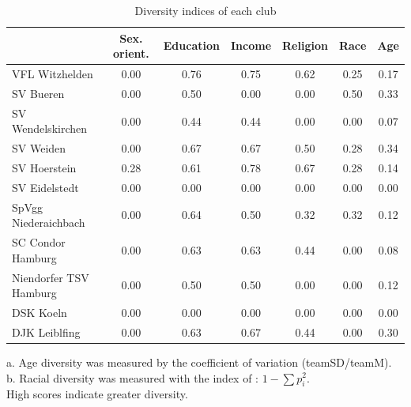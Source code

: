 \documentclass[	
	12pt, %
	a4paper, %
]{scrartcl}\usepackage[]{graphicx}\usepackage[]{color}
\begin{document}
\begin{table}[htb]
\centering
\begin{tabular}{lcccccc}
\hline
  & Sex. orient. & Education & Income & Religion & Race & Age \\ 
\hline 
VFL Witzhelden & 0.00 & 0.76 &0.75 &0.62 &0.25&0.17 \\
SV Bueren & 0.00 & 0.50 & 0.00 & 0.00 & 0.50&0.33\\
SV Wendelskirchen & 0.00 & 0.44 & 0.44 & 0.00 & 0.00&0.07 \\
SV Weiden & 0.00 & 0.67 & 0.67 & 0.50 & 0.28 &0.34\\
SV Hoerstein & 0.28 & 0.61 & 0.78 & 0.67& 0.28&0.14 \\
SV Eidelstedt & 0.00 & 0.00 &0.00 &0.00 &0.00  &0.00\\
SpVgg Niederaichbach & 0.00 & 0.64 &0.50 &0.32 &0.32&0.12 \\
SC Condor Hamburg & 0.00 & 0.63 & 0.63& 0.44 & 0.00&0.08\\
Niendorfer TSV Hamburg & 0.00 & 0.50 & 0.50& 0.00&0.00&0.12 \\
DSK Koeln & 0.00 & 0.00 & 0.00 & 0.00 & 0.00  &0.00\\ 
DJK Leiblfing & 0.00 & 0.63 & 0.67 & 0.44 & 0.00&0.30 \\ 
\hline 
\end{tabular} 
\begin{flushleft}
a. Age diversity was measured by the coefficient of variation (teamSD/teamM).\\
b. Racial diversity was measured with the index of : $ 1 - \sum p_i^{2} $. \\
High scores indicate greater diversity.
\end{flushleft}
\caption{Diversity indices of each club}
\label{tab:indices}
\end{table}
\end{document}
